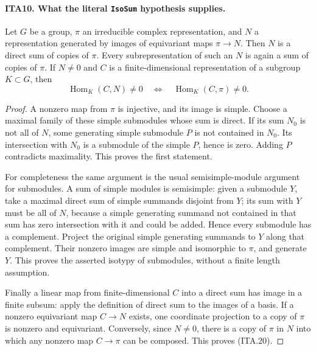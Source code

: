 \documentclass[11pt,a4paper]{article}
\numberwithin{equation}{section}
\theoremstyle{remark}\newtheorem{remark}[theorem]{Remark}
\begin{document}
\paragraph{ITA10. What the literal \texttt{Iso\allowbreak Sum} hypothesis supplies.}
\label{claim:ITA10}
Let $G$ be a group, $\pi$ an irreducible complex representation,
and $N$ a representation generated by images of equivariant
maps $\pi\to N$.  Then $N$ is a direct sum of copies of
$\pi$.  Every subrepresentation of such an $N$ is again
a sum of copies of $\pi$.  If $N\ne0$ and $C$ is a
finite-dimensional representation of a subgroup $K\subset G$,
then
\[
                 \operatorname{Hom}_K(C,N)\ne0
                   \quad\Longleftrightarrow\quad
                 \operatorname{Hom}_K(C,\pi)\ne0.            \tag{ITA.20}
\]
\begin{proof}
A nonzero map from $\pi$ is injective, and its image is
simple.  Choose a maximal family of these simple
submodules whose sum is direct.  If its sum $N_0$ is not
all of $N$, some generating simple submodule $P$ is not
contained in $N_0$.  Its intersection with $N_0$ is a
submodule of the simple $P$, hence is zero.  Adding $P$
contradicts maximality.  This proves the first statement.

For completeness the same argument is the usual
semisimple-module argument for submodules.  A sum of
simple modules is semisimple: given a submodule $Y$, take
a maximal direct sum of simple summands disjoint from
$Y$; its sum with $Y$ must be all of $N$, because a
simple generating summand not contained in that sum has
zero intersection with it and could be added.  Hence
every submodule has a complement.  Project the original
simple generating summands to $Y$ along that complement.
Their nonzero images are simple and isomorphic to
$\pi$, and generate $Y$.  This proves the asserted
isotypy of submodules, without a finite length assumption.

Finally a linear map from finite-dimensional $C$ into a
direct sum has image in a finite subsum: apply the
definition of direct sum to the images of a basis.
If a nonzero equivariant map $C\to N$ exists, one
coordinate projection to a copy of $\pi$ is nonzero
and equivariant.  Conversely, since $N\ne0$, there is
a copy of $\pi$ in $N$ into which any nonzero map
$C\to\pi$ can be composed.  This proves (ITA.20).
\end{proof}

\end{document}
